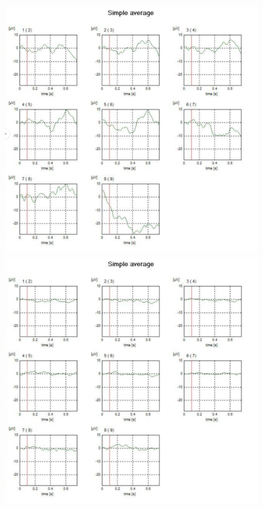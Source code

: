 \begin{figure}[H]
\begin{minipage}[b]{.3\textwidth}
    \end{minipage}
    \begin{minipage}[b]{.3\textwidth}
        \centering
        \includegraphics[keepaspectratio,width=\textwidth]{../../12_DataAnalysis/bmi_target.png}
    \end{minipage}
    \begin{minipage}[b]{.3\textwidth}
        \centering
        \includegraphics[keepaspectratio,width=\textwidth]{../../12_DataAnalysis/bmi_nontarget.png}

\end{minipage}
\end{figure}
